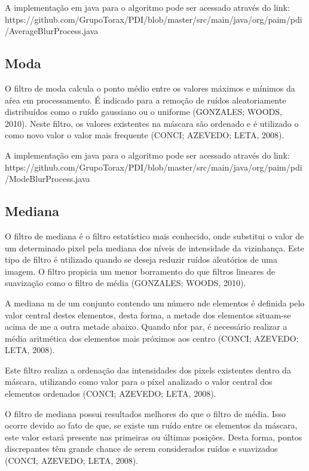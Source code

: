 \documentclass[
	12pt,				%
	oneside,			%
	a4paper,			%
	english,			%
	french,				%
	spanish,			%
	brazil,				%
	]{abntex2}
\begin{document}
A implementação em java para o algoritmo pode ser acessado através do link: https://github.com/GrupoTorax/PDI/blob/master/src/main/java/org/paim/pdi/AverageBlurProcess.java 

\subsection{Moda}
O filtro de moda calcula o ponto médio entre os valores máximos e mínimos da aŕea em processamento. É indicado para a remoção de ruídos aleatoriamente distribuídos como o ruído gaussiano ou o uniforme (GONZALES; WOODS, 2010). Neste filtro, os valores existentes na máscara são ordenado e é utilizado o como novo valor o valor mais frequente (CONCI; AZEVEDO; LETA, 2008).

A implementação em java para o algoritmo pode ser acessado através do link:
https://github.com/GrupoTorax/PDI/blob/master/src/main/java/org/paim/pdi/ModeBlurProcess.java 

\subsection{Mediana}

 O filtro de mediana é o filtro estatístico mais conhecido, onde substitui o valor de um determinado pixel pela mediana dos níveis de intensidade da vizinhança. Este tipo de filtro é utilizado quando se deseja reduzir ruídos aleatórios de uma imagem. O filtro propicia um menor borramento do que filtros lineares de suavização como o filtro de média (GONZALES; WOODS, 2010).

A mediana m de um conjunto contendo um número nde elementos é definida pelo valor central destes elementos, desta forma, a metade dos elementos situam-se acima de me a outra metade abaixo. Quando nfor par, é necessário realizar a média aritmética dos elementos mais próximos aos centro (CONCI; AZEVEDO; LETA, 2008).

Este filtro realiza a ordenação das intensidades dos pixels existentes dentro da máscara, utilizando como valor para o píxel analizado o valor central dos elementos ordenados (CONCI; AZEVEDO; LETA, 2008).

O filtro de mediana possui resultados melhores do que o filtro de média. Isso ocorre devido ao fato de que, se existe um ruído entre os elementos da máscara, este valor estará presente nas primeiras ou últimas posições. Desta forma, pontos discrepantes têm grande chance de serem considerados ruídos e suavizados (CONCI; AZEVEDO; LETA, 2008).
\end{document}

